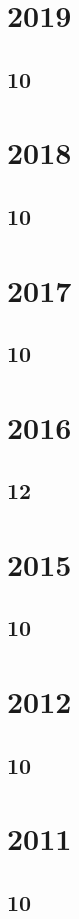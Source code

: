 \documentclass[11pt]{book}
\begin{document}
\section{2019}
\subsection{10}

\section{2018}
\subsection{10}

\section{2017}
\subsection{10}



\section{2016}
\subsection{12}


\section{2015}
\subsection{10}

\section{2012}
\subsection{10}


\section{2011}
\subsection{10}


\end{document}
